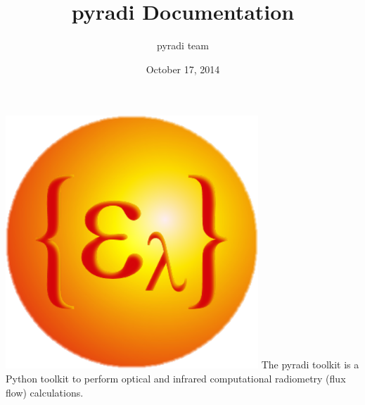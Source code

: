 \documentclass[a4paper,10pt,english]{sphinxmanual}
\title{pyradi Documentation}
\date{October 17, 2014}
\author{pyradi team}
\begin{document}
\maketitle
\tableofcontents
{}\label{index::doc}


{\includegraphics{pyradi.png}\hfill}
\label{index:module-pyradi}
The pyradi toolkit is a Python toolkit to perform optical and infrared 
computational radiometry (flux flow) calculations.
\end{document}
